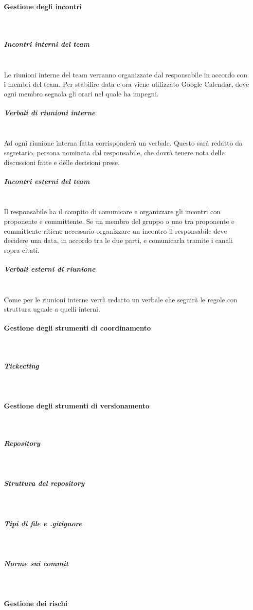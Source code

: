 			\paragraph{Gestione degli incontri} \mbox{}\\
			\subparagraph{Incontri interni del team} \mbox{}\\
			Le riunioni interne del team verranno organizzate dal responsabile in accordo con i membri del team. Per stabilire data e ora viene utilizzato Google Calendar, dove ogni membro segnala gli orari nel quale ha impegni.
			\subparagraph{Verbali di riunioni interne} \mbox{}\\
			Ad ogni riunione interna fatta corrisponderà un verbale. Questo sarà redatto da segretario, persona nominata dal responsabile, che dovrà tenere nota delle discussioni fatte e delle decisioni prese. 
			\subparagraph{Incontri esterni del team} \mbox{}\\
			Il responsabile ha il compito di comunicare e organizzare gli incontri con  proponente e committente. Se un membro del gruppo o uno tra proponente e committente ritiene necessario organizzare un incontro il responsabile deve decidere una data, in accordo tra le due parti, e comunicarla tramite i canali sopra citati.
			\subparagraph{Verbali esterni di riunione} \mbox{}\\
			Come per le riunioni interne verrà redatto un verbale che seguirà le regole con struttura uguale a quelli interni.
			\paragraph{Gestione degli strumenti di coordinamento} \mbox{}\\
			\subparagraph{Tickecting} \mbox{}\\
			\paragraph{Gestione degli strumenti di versionamento} \mbox{}\\
			\subparagraph{Repository} \mbox{}\\
			\subparagraph{Struttura del repository} \mbox{}\\
			\subparagraph{Tipi di file e .gitignore} \mbox{}\\
			\subparagraph{Norme sui commit} \mbox{}\\
			\paragraph{Gestione dei rischi} \mbox{}\\
			
